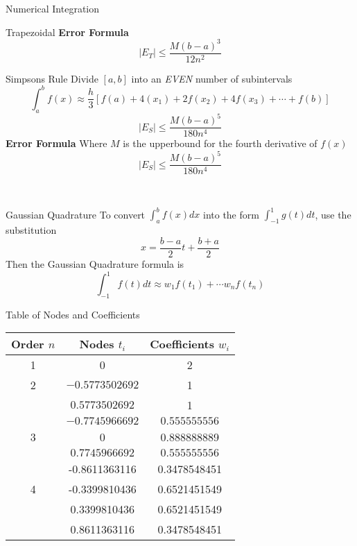 \documentclass{article}
\begin{document}
\begin{multicols*}{3}
\begin{blackbox}{Numerical Integration}
{\begin{brownbox}{Trapezoidal}
            \textbf{Error Formula}\\[-2ex]
            \[|E_T| \leq \frac{M(b-a)^3}{12n^2}\]
        \end{brownbox}
        \begin{pinkbox}{Simpsons Rule}
            Divide $[a,b]$ into an \emph{EVEN} number of subintervals\\[-2ex]
            \[\int_a^b f(x) \approx \frac{h}{3}\left[f(a) + 4(x_1) + 2f(x_2) + 4f(x_3) + \cdots + f(b)\right]\]
            \[|E_S| \leq \frac{M(b-a)^5}{180n^4}\]
            \textbf{Error Formula} Where  $M$ is the upperbound for the fourth derivative of $f(x)$\\[-2ex]
            \[|E_S| \leq \frac{M(b-a)^5}{180n^4}\]
        \end{pinkbox}\\[-2ex]
    }
\end{blackbox}
\begin{blackbox}{Gaussian Quadrature}
    To convert $\int_a^bf(x)dx$ into the form $\int_{-1}^1g(t)dt$, use the substitution\\[-4ex]
    \[x = \frac{b-a}{2}t + \frac{b+a}{2}\]
    Then the Gaussian Quadrature formula is\\[-2ex]
    \[\int_{-1}^{1}f(t)dt \approx w_1f(t_1) + \cdots w_nf(t_n)\]
    \begin{redbox}{Table of Nodes and Coefficients}
        \begin{center}
            \begin{tabular}{c|cc}
                Order $n$ & Nodes $t_i$ & Coefficients $w_i$\\
                \hline
                1 & 0 & 2\\
                \hline
                2 & $-0.5773502692$ & 1\\
                & $0.5773502692$ & 1\\
                \hline
                & $-0.7745966692$ & $0.555555556$\\
                3 & 0 & 0.888888889\\
                & $0.7745966692$ & $0.555555556$\\
                \hline
                & -0.8611363116 &0.3478548451\\
                4&-0.3399810436& 0.6521451549\\
                &0.3399810436 &0.6521451549\\
                &0.8611363116 &0.3478548451\\

\end{tabular}
\end{center}
\end{redbox}
\end{blackbox}
\end{multicols*}
\end{document}

